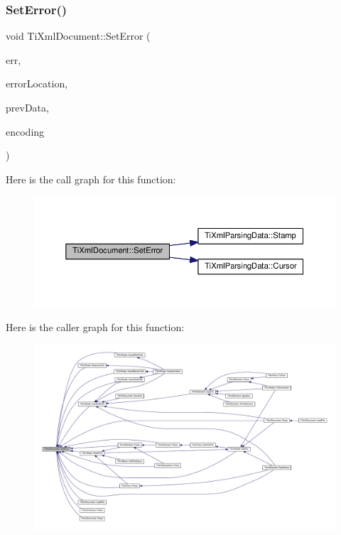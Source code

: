 \subsubsection{\texorpdfstring{Set\+Error()}{SetError()}}
{\footnotesize\ttfamily void Ti\+Xml\+Document\+::\+Set\+Error (\begin{DoxyParamCaption}\item[{int}]{err,  }\item[{const char $\ast$}]{error\+Location,  }\item[{\hyperlink{class_ti_xml_parsing_data}{Ti\+Xml\+Parsing\+Data} $\ast$}]{prev\+Data,  }\item[{\hyperlink{tinyxml_8h_a88d51847a13ee0f4b4d320d03d2c4d96}{Ti\+Xml\+Encoding}}]{encoding }\end{DoxyParamCaption})}

Here is the call graph for this function\+:
\nopagebreak
\begin{figure}[H]
\begin{center}
\leavevmode
\includegraphics[width=350pt]{class_ti_xml_document_a735c23e318597b920c94eae77fa206de_cgraph}
\end{center}
\end{figure}
Here is the caller graph for this function\+:
\nopagebreak
\begin{figure}[H]
\begin{center}
\leavevmode
\includegraphics[width=350pt]{class_ti_xml_document_a735c23e318597b920c94eae77fa206de_icgraph}
\end{center}
\end{figure}
\mbox{\label{class_ti_xml_document_a51dac56316f89b35bdb7d0d433ba988e}} 
